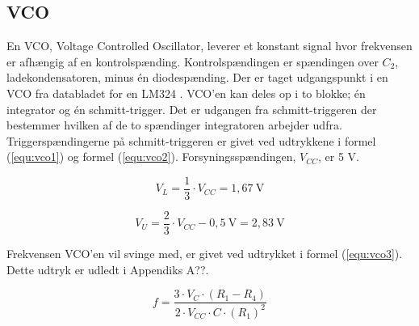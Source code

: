 \subsection*{VCO}
\label{volumenkontrol-design-vco}

En VCO, Voltage Controlled Oscillator, leverer et konstant signal hvor frekvensen er afhængig af en kontrolspænding. Kontrolspændingen er spændingen over $C_2$, ladekondensatoren, minus én diodespænding. Der er taget udgangspunkt i en VCO fra databladet for en LM324 \cite{lm324-datablad}. VCO'en kan deles op i to blokke; én integrator og én schmitt-trigger. Det er udgangen fra schmitt-triggeren der bestemmer hvilken af de to spændinger integratoren arbejder udfra. Triggerspændingerne på schmitt-triggeren er givet ved udtrykkene i formel (\ref{equ:vco1}) og formel (\ref{equ:vco2}). Forsyningsspændingen, $V_{CC}$, er 5 V.

\begin{equation}
\label{equ:vco1}
V_L = \frac{1}{3} \cdot V_{CC} = 1,67~\mathrm{V}
\end{equation}

\begin{equation}
\label{equ:vco2}
V_U = \frac{2}{3} \cdot V_{CC} - 0,5~\mathrm{V} = 2,83~\mathrm{V}
\end{equation}

Frekvensen VCO'en vil svinge med, er givet ved udtrykket i formel (\ref{equ:vco3}). Dette udtryk er udledt i Appendiks A??.

\begin{equation}
\label{equ:vco3}
f = \frac{3 \cdot V_C \cdot (R_1 - R_4)}{2 \cdot V_{CC} \cdot C \cdot (R_1)^2}
\end{equation}

